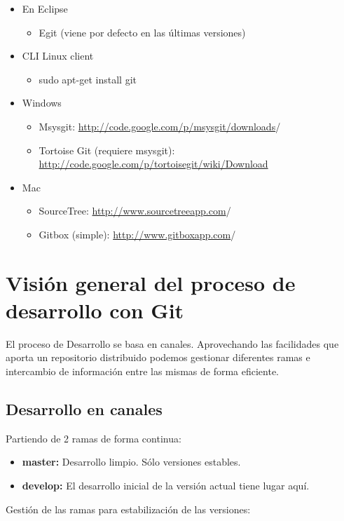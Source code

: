 \begin{itemize}
\item
  En Eclipse
  \begin{itemize}
  \item
    Egit (viene por defecto en las últimas versiones)
  \end{itemize}
\item
  CLI Linux client
  \begin{itemize}
  \item
    sudo apt-get install git
  \end{itemize}
\item
  Windows
  \begin{itemize}
  \item
    Msysgit:
    \href{http://code.google.com/p/msysgit/downloads}{http://code.google.com/p/msysgit/downloads}/
  \item
    Tortoise Git (requiere msysgit):
    \href{http://code.google.com/p/tortoisegit/wiki/Download}{http://code.google.com/p/tortoisegit/wiki/Download}
  \end{itemize}
\item
  Mac
  \begin{itemize}
  \item
    SourceTree:
    \href{http://www.sourcetreeapp.com}{http://www.sourcetreeapp.com}/
  \item
    Gitbox (simple):
    \href{http://www.gitboxapp.com}{http://www.gitboxapp.com}/
  \end{itemize}
\end{itemize}
\section{Visión general del proceso de desarrollo con Git}

El proceso de Desarrollo se basa en canales. Aprovechando las
facilidades que aporta un repositorio distribuido podemos gestionar
diferentes ramas e intercambio de información entre las mismas de forma
eficiente.

\subsection{Desarrollo en canales}

Partiendo de 2 ramas de forma continua:

\begin{itemize}
\item
  \textbf{master:} Desarrollo limpio. Sólo versiones estables.
\item
  \textbf{develop:} El desarrollo inicial de la versión actual tiene
  lugar aquí.
\end{itemize}
Gestión de las ramas para estabilización de las versiones:

